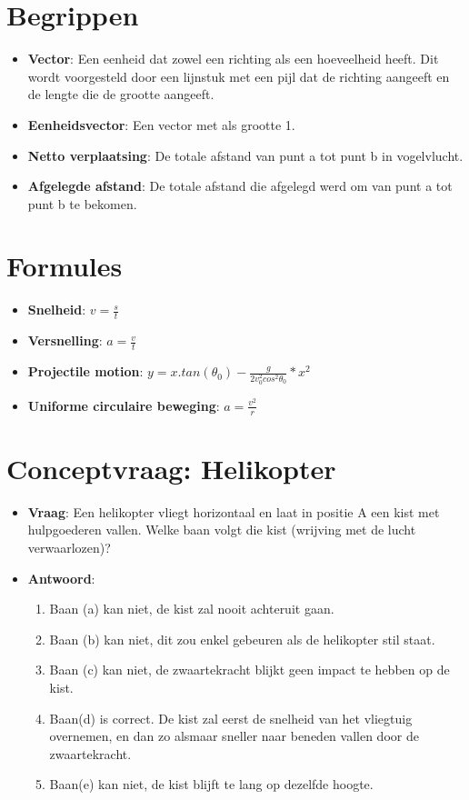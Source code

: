 \documentclass[12pt]{report}
\newcommand{\important}[1] {\textbf{\color{orange}#1}}
\begin{document}
\section{Begrippen}
\begin{itemize}
\item {\important{Vector}: Een eenheid dat zowel een richting als een hoeveelheid heeft. Dit wordt voorgesteld door een lijnstuk met een pijl dat de richting aangeeft en de lengte die de grootte aangeeft.}
\item {\important{Eenheidsvector}: Een vector met als grootte 1.}
\item {\important{Netto verplaatsing}: De totale afstand van punt a tot punt b in vogelvlucht.}
\item {\important{Afgelegde afstand}: De totale afstand die afgelegd werd om van punt a tot punt b te bekomen.}
\end{itemize}

\section{Formules}
\begin{itemize}
  \item {\important{Snelheid}: $v = \frac{s}{t}$}
  \item {\important{Versnelling}: $a = \frac{v}{t}$}
  \item {\important{Projectile motion}: $y = x.tan(\theta_0) - \frac{g}{2v^{2}_0cos^2\theta_0}*x^2$}
  \item {\important{Uniforme circulaire beweging}: $a = \frac{v^2}{r}$}
\end{itemize}

\section{Conceptvraag: Helikopter}
\begin{itemize}
\item {\textbf{Vraag}: Een helikopter vliegt horizontaal en laat in positie A een kist met hulpgoederen vallen. Welke baan volgt die kist (wrijving met de lucht verwaarlozen)?}
\item {\textbf{Antwoord}: \begin{enumerate}
    \item {Baan (a) kan niet, de kist zal nooit achteruit gaan.}
    \item {Baan (b) kan niet, dit zou enkel gebeuren als de helikopter stil staat.}
    \item {Baan (c) kan niet, de zwaartekracht blijkt geen impact te hebben op de kist.}
    \item {Baan(d) is correct. De kist zal eerst de snelheid van het vliegtuig overnemen, en dan zo alsmaar sneller
        naar beneden vallen door de zwaartekracht.}
    \item {Baan(e) kan niet, de kist blijft te lang op dezelfde hoogte.}
    \end{enumerate}}
\end{itemize}
\end{document}
